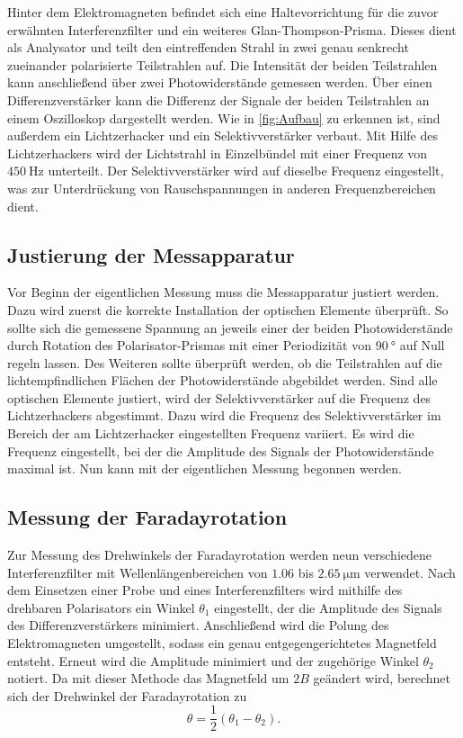 Hinter dem Elektromagneten befindet sich eine Haltevorrichtung für die zuvor erwähnten Interferenzfilter und ein weiteres Glan-Thompson-Prisma. Dieses dient als 
Analysator und teilt den eintreffenden Strahl in zwei genau senkrecht zueinander polarisierte Teilstrahlen auf. Die Intensität der beiden Teilstrahlen kann anschließend 
über zwei Photowiderstände gemessen werden. Über einen Differenzverstärker kann die Differenz der Signale der beiden Teilstrahlen an einem 
Oszilloskop dargestellt werden. Wie in \autoref{fig:Aufbau} zu erkennen ist, sind außerdem ein \glqq Lichtzerhacker\grqq{} und ein Selektivverstärker verbaut. 
Mit Hilfe des Lichtzerhackers wird der Lichtstrahl in Einzelbündel mit einer Frequenz von $\qty{450}{\hertz}$ unterteilt. Der Selektivverstärker wird auf dieselbe 
Frequenz eingestellt, was zur Unterdrückung von Rauschspannungen in anderen Frequenzbereichen dient.

\subsection{Justierung der Messapparatur}
Vor Beginn der eigentlichen Messung muss die Messapparatur justiert werden. Dazu wird zuerst die korrekte Installation der optischen Elemente überprüft. 
So sollte sich die gemessene Spannung an jeweils einer der beiden Photowiderstände durch Rotation des Polarisator-Prismas mit einer Periodizität von $\qty{90}{\degree}$ 
auf Null regeln lassen. Des Weiteren sollte überprüft werden, ob die Teilstrahlen auf die lichtempfindlichen Flächen der Photowiderstände abgebildet werden. 
Sind alle optischen Elemente justiert, wird der Selektivverstärker auf die Frequenz des Lichtzerhackers abgestimmt. Dazu wird die Frequenz des Selektivverstärker 
im Bereich der am Lichtzerhacker eingestellten Frequenz variiert. Es wird die Frequenz eingestellt, bei der die Amplitude des Signals der Photowiderstände maximal ist.
Nun kann mit der eigentlichen Messung begonnen werden.

\subsection{Messung der Faradayrotation}
\label{subsec:Messung der Faradayrotation}
Zur Messung des Drehwinkels der Faradayrotation werden neun verschiedene Interferenzfilter mit Wellenlängenbereichen von $\num{1.06}$ bis $\qty{2.65}{\micro\metre}$ verwendet.
Nach dem Einsetzen einer Probe und eines Interferenzfilters wird mithilfe des drehbaren Polarisators ein Winkel $\theta_1$ eingestellt, der die Amplitude des Signals des 
Differenzverstärkers 
minimiert. Anschließend wird die Polung des Elektromagneten umgestellt, sodass ein genau entgegengerichtetes Magnetfeld entsteht. Erneut wird die Amplitude minimiert und der 
zugehörige Winkel $\theta_2$ notiert. Da mit dieser Methode das Magnetfeld um $2B$ geändert wird, berechnet sich der Drehwinkel der Faradayrotation zu 
\begin{equation}
    \label{eqn:theta_diff}
    \theta = \frac{1}{2}(\theta_1 -\theta_2).
\end{equation}

